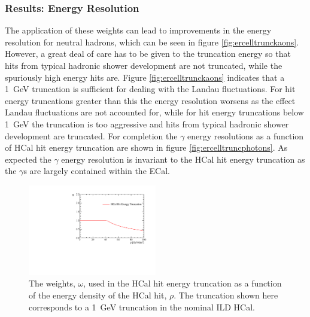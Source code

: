 
\subsubsection{Results: Energy Resolution}

The application of these weights can lead to improvements in the energy resolution for neutral hadrons, which can be seen in figure \ref{fig:ercelltrunckaons}.  However, a great deal of care has to be given to the truncation energy so that hits from typical hadronic shower development are not truncated, while the spuriously high energy hits are.  Figure \ref{fig:ercelltrunckaons} indicates that a 1~GeV truncation is sufficient for dealing with the Landau fluctuations.  For hit energy truncations greater than this the energy resolution worsens as the effect Landau fluctuations are not accounted for, while for hit energy truncations below 1~GeV the truncation is too aggressive and hits from typical hadronic shower development are truncated.  For completion the $\gamma$ energy resolutions as a function of HCal hit energy truncation are shown in figure \ref{fig:ercelltruncphotons}.  As expected the $\gamma$ energy resolution is invariant to the HCal hit energy truncation as the $\gamma$s are largely contained within the ECal.

\begin{figure}[h!]
\includegraphics[width=0.5\textwidth]{EnergyEstimators/Plots/SoftComp/Weights/CellTruncWeights.pdf}
\caption[The weights, $\omega$, used in the HCal hit energy truncation as a function of the energy density of the HCal hit, $\rho$.  The truncation shown here corresponds to a 1~GeV truncation in the nominal ILD HCal.]{The weights, $\omega$, used in the HCal hit energy truncation as a function of the energy density of the HCal hit, $\rho$.  The truncation shown here corresponds to a 1~GeV truncation in the nominal ILD HCal.}
\label{fig:hcalcellweight}
\end{figure}

